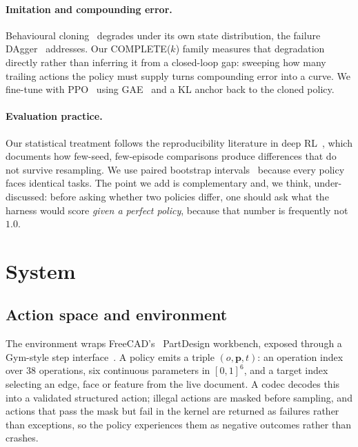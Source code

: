 \documentclass{article}
\begin{document}
\paragraph{Imitation and compounding error.} Behavioural
cloning~\citep{pomerleau1988alvinn} degrades under its own state
distribution, the failure DAgger~\citep{ross2011dagger} addresses. Our
COMPLETE($k$) family measures that degradation directly rather than inferring it
from a closed-loop gap: sweeping how many trailing actions the policy must
supply turns compounding error into a curve. We fine-tune with
PPO~\citep{schulman2017ppo} using GAE~\citep{schulman2016gae} and a KL anchor
back to the cloned policy.

\paragraph{Evaluation practice.} Our statistical treatment follows the
reproducibility literature in deep RL~\citep{henderson2018deeprl,
agarwal2021deeprl}, which documents how few-seed, few-episode comparisons
produce differences that do not survive resampling. We use paired
bootstrap intervals~\citep{efron1993bootstrap} because every policy faces
identical tasks. The point we add is complementary and, we think,
under-discussed: before asking whether two policies differ, one should ask what
the harness would score \emph{given a perfect policy}, because that number is
frequently not $1.0$.

\section{System}\label{sec:system}

\subsection{Action space and environment}

The environment wraps FreeCAD's~\citep{freecad} PartDesign workbench, exposed
through a Gym-style step interface~\citep{brockman2016gym}. A policy emits a triple
$(o, \mathbf{p}, t)$: an operation index over 38 operations, six continuous
parameters in $[0,1]^6$, and a target index selecting an edge, face or feature
from the live document. A codec decodes this into a validated structured action;
illegal actions are masked before sampling, and actions that pass the mask but
fail in the kernel are returned as failures rather than exceptions, so the
policy experiences them as negative outcomes rather than crashes.
\end{document}
